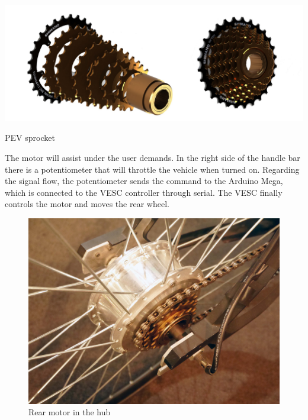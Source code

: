 \begin{marginfigure}[0cm]
	\includegraphics[width=1\linewidth]{figs/05/Sprocket}
	\caption{PEV sprocket}
\end{marginfigure}

The motor will assist under the user demands. In the right side of the handle bar there is a potentiometer that will throttle the vehicle when turned on. Regarding the signal flow, the potentiometer sends the command to the Arduino Mega, which is connected to the VESC controller through serial. The VESC finally controls the motor and moves the rear wheel. 

\begin{figure}[h!]
	\includegraphics[width=1\linewidth]{figs/05/P1050729}
	\caption{Rear motor in the hub}
\end{figure}

